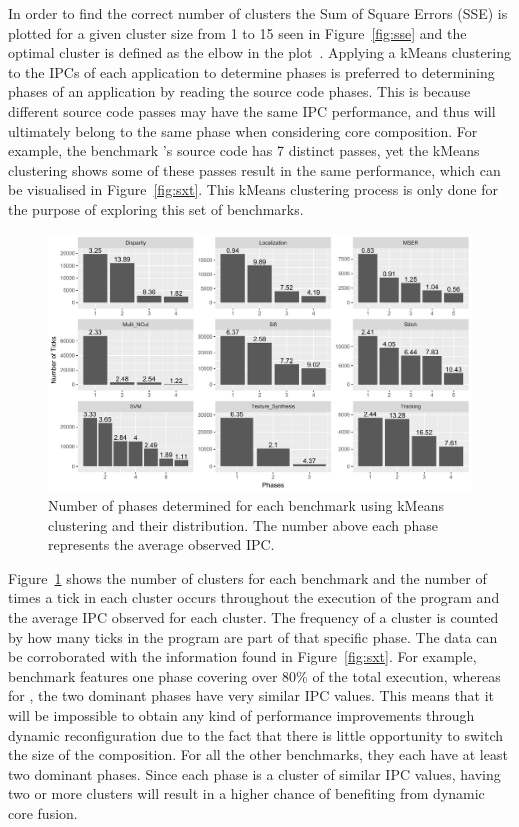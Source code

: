 In order to find the correct number of clusters the Sum of Square Errors (SSE) is plotted for a given cluster size from 1 to 15 seen in Figure~\ref{fig:sse} and the optimal cluster is defined as the elbow in the plot~\cite{everitCluster2001}.
Applying a kMeans clustering to the IPCs of each application to determine phases is preferred to determining phases of an application by reading the source code phases.
This is because different source code passes may have the same IPC performance, and thus will ultimately belong to the same phase when considering core composition.
For example, the benchmark 's source code has 7 distinct passes, yet the kMeans clustering shows some of these passes result in the same performance, which can be visualised in Figure~\ref{fig:sxt}.
This kMeans clustering process is only done for the purpose of exploring this set of benchmarks.

\begin{figure}[t]
    \centering
    \includegraphics[width=1\textwidth]{cases-paper/graphics/Exploration/clusters4.pdf}
    \caption{Number of phases determined for each benchmark using kMeans clustering and their distribution. The number above each phase represents the average observed IPC.}
    \label{fig:clust}
		\vspace{1em}
\end{figure}

Figure~\ref{fig:clust} shows the number of clusters for each benchmark and the number of times a tick in each cluster occurs throughout the execution of the program and the average IPC observed for each cluster.
The frequency of a cluster is counted by how many ticks in the program are part of that specific phase.
The data can be corroborated with the information found in Figure~\ref{fig:sxt}.
For example, benchmark  features one phase covering over 80\% of the total execution, whereas for , the two dominant phases have very similar IPC values.
This means that it will be impossible to obtain any kind of performance improvements through dynamic reconfiguration due to the fact that there is little opportunity to switch the size of the composition.
For all the other benchmarks, they each have at least two dominant phases.
Since each phase is a cluster of similar IPC values, having two or more clusters will result in a higher chance of benefiting from dynamic core fusion.

